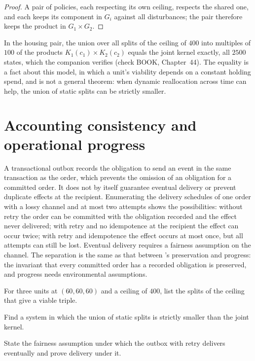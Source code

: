 \begin{proof}
A pair of policies, each respecting its own ceiling, respects the shared one, and each keeps its component in $G_i$ against all disturbances; the pair therefore keeps the product in $G_1\times G_2$.
\end{proof}

In the housing pair, the union over all splits of the ceiling of $400$ into multiples of $100$ of the products $K_1(c_1)\times K_2(c_2)$ equals the joint kernel exactly, all $2500$ states, which the companion verifies (check BOOK, Chapter~44). The equality is a fact about this model, in which a unit's viability depends on a constant holding spend, and is not a general theorem: when dynamic reallocation across time can help, the union of static splits can be strictly smaller.

\section{Accounting consistency and operational progress}

A transactional outbox records the obligation to send an event in the same transaction as the order, which prevents the omission of an obligation for a committed order. It does not by itself guarantee eventual delivery or prevent duplicate effects at the recipient. Enumerating the delivery schedules of one order with a lossy channel and at most two attempts shows the possibilities: without retry the order can be committed with the obligation recorded and the effect never delivered; with retry and no idempotence at the recipient the effect can occur twice; with retry and idempotence the effect occurs at most once, but all attempts can still be lost. Eventual delivery requires a fairness assumption on the channel. The separation is the same as that between 's preservation and progress: the invariant that every committed order has a recorded obligation is preserved, and progress needs environmental assumptions.

\begin{exercise}
For three units at $(60,60,60)$ and a ceiling of $400$, list the splits of the ceiling that give a viable triple.
\end{exercise}
\begin{exercise}
Find a system in which the union of static splits is strictly smaller than the joint kernel.
\end{exercise}
\begin{exercise}
State the fairness assumption under which the outbox with retry delivers eventually and prove delivery under it.
\end{exercise}

